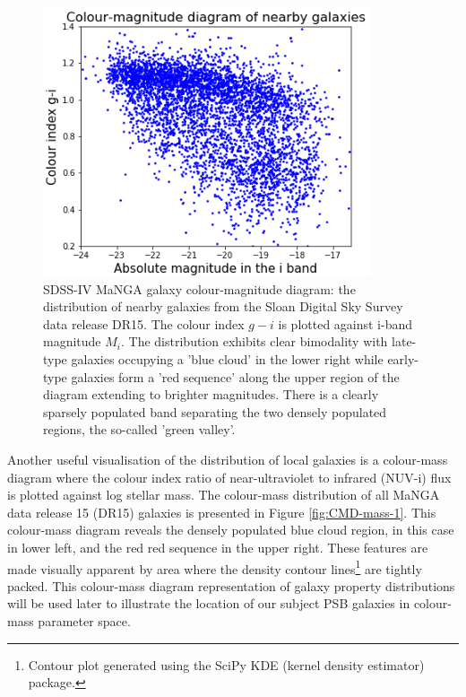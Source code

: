 \begin{figure}
    \centering
    \includegraphics[width=\columnwidth]{images/CMDs/CMD-G_i-i.png}
    \caption[SDSS-IV MaNGA galaxy colour-magnitude diagram]{SDSS-IV MaNGA galaxy colour-magnitude diagram: the distribution of nearby galaxies from the Sloan Digital Sky Survey data release DR15. The colour index $g-i$ is plotted against i-band magnitude $M_i$. The distribution exhibits clear bimodality with late-type galaxies occupying a 'blue cloud' in the lower right while early-type galaxies form a 'red sequence' along the upper region of the diagram extending to brighter magnitudes. There is a clearly sparsely populated band separating the two densely populated regions, the so-called 'green valley'.}
    \label{fig:CMD-G_i-i}
\end{figure}

Another useful visualisation of the distribution of local galaxies is a colour-mass diagram where the colour index ratio of near-ultraviolet to infrared (NUV-i) flux is plotted against log stellar mass. The colour-mass distribution of all MaNGA data release 15 (DR15) galaxies is presented in Figure \ref{fig:CMD-mass-1}. This colour-mass diagram reveals the densely populated blue cloud region, in this case in lower left, and the red red sequence in the upper right. These features are made visually apparent by area where the density contour lines\footnote{Contour plot generated using the SciPy KDE (kernel density estimator) package.} are tightly packed. This colour-mass diagram representation of galaxy property distributions will be used later to illustrate the location of our subject PSB galaxies in colour-mass parameter space.

